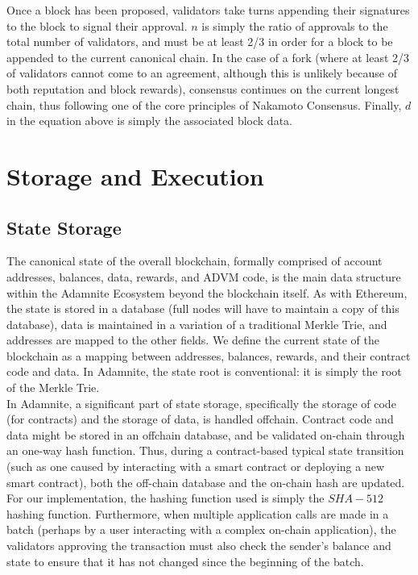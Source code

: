 \documentclass[conference]{IEEEtran}
\begin{document}
Once a block has been proposed, validators take turns appending their signatures to the block to signal their approval. $n$ is simply the ratio of approvals to the total number of validators, and must be at least 2/3 in order for a block to be appended to the current canonical chain. In the case of a fork (where at least 2/3 of validators cannot come to an agreement, although this is unlikely because of both reputation and block rewards), consensus continues on the current longest chain, thus following one of the core principles of Nakamoto Consensus.  Finally, $d$ in the equation above is simply the associated block data.

\section{Storage and Execution}

\subsection{State Storage}
The canonical state of the overall blockchain, formally comprised of account addresses, balances, data, rewards, and ADVM code, is the main data structure within the Adamnite Ecosystem beyond the blockchain itself. As with Ethereum, the state is stored in a database (full nodes will have to maintain a copy of this database), data is maintained in a variation of a traditional Merkle Trie, and addresses are mapped to the other fields. We define the current state of the blockchain as a mapping between addresses, balances, rewards, and their contract code and data. In Adamnite, the state root is conventional: it is simply the root of the Merkle Trie. \\

In Adamnite, a significant part of state storage, specifically the storage of code (for contracts) and the storage of data, is handled offchain. Contract code and data might be stored in an offchain database, and be validated on-chain through an one-way hash function. Thus, during a contract-based typical state transition (such as one caused by interacting with a smart contract or deploying a new smart contract), both the off-chain database and the on-chain hash are updated. For our implementation, the hashing function used is simply the $SHA-512$ hashing function. Furthermore, when multiple application calls are made in a batch (perhaps by a user interacting with a complex on-chain application), the validators approving the transaction must also check the sender's balance and state to ensure that it has not changed since the beginning of the batch.\\
\end{document}
